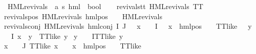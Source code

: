 \begin{isabellebody}
\ HML{\isacharunderscore}{\kern0pt}revivals\ {\isacharcolon}{\kern0pt}{\isacharcolon}{\kern0pt}\ {\isachardoublequoteopen}{\isacharparenleft}{\kern0pt}{\isacharprime}{\kern0pt}a{\isacharcomma}{\kern0pt}\ {\isacharprime}{\kern0pt}s{\isacharparenright}{\kern0pt}\ hml\ {\isasymRightarrow}\ bool{\isachardoublequoteclose}\ \isanewline
\ \ \isanewline
revivals{\isacharunderscore}{\kern0pt}tt{\isacharcolon}{\kern0pt}\ {\isachardoublequoteopen}HML{\isacharunderscore}{\kern0pt}revivals\ TT{\isachardoublequoteclose}\ {\isacharbar}{\kern0pt}\isanewline
revivals{\isacharunderscore}{\kern0pt}pos{\isacharcolon}{\kern0pt}\ {\isachardoublequoteopen}HML{\isacharunderscore}{\kern0pt}revivals\ {\isacharparenleft}{\kern0pt}hml{\isacharunderscore}{\kern0pt}pos\ {\isasymalpha}\ {\isasymphi}{\isacharparenright}{\kern0pt}{\isachardoublequoteclose}\ \ {\isachardoublequoteopen}HML{\isacharunderscore}{\kern0pt}revivals\ {\isasymphi}{\isachardoublequoteclose}\ {\isacharbar}{\kern0pt}\isanewline
revivals{\isacharunderscore}{\kern0pt}conj{\isacharcolon}{\kern0pt}\ {\isachardoublequoteopen}HML{\isacharunderscore}{\kern0pt}revivals\ {\isacharparenleft}{\kern0pt}hml{\isacharunderscore}{\kern0pt}conj\ I\ J\ {\isasymPhi}{\isacharparenright}{\kern0pt}{\isachardoublequoteclose}\ \ {\isachardoublequoteopen}{\isacharparenleft}{\kern0pt}{\isasymexists}x\ {\isasymin}\ {\isacharparenleft}{\kern0pt}{\isasymPhi}\ {\isacharbackquote}{\kern0pt}\ I{\isacharparenright}{\kern0pt}{\isachardot}{\kern0pt}\ {\isacharparenleft}{\kern0pt}{\isasymexists}{\isasymalpha}\ {\isasymchi}{\isachardot}{\kern0pt}\ {\isacharparenleft}{\kern0pt}x\ {\isacharequal}{\kern0pt}\ hml{\isacharunderscore}{\kern0pt}pos\ {\isasymalpha}\ {\isasymchi}{\isacharparenright}{\kern0pt}\ {\isasymand}\ TT{\isacharunderscore}{\kern0pt}like\ {\isasymchi}{\isacharparenright}{\kern0pt}\ {\isasymand}\ {\isacharparenleft}{\kern0pt}{\isasymforall}y\ {\isasymin}\ {\isacharparenleft}{\kern0pt}{\isasymPhi}\ {\isacharbackquote}{\kern0pt}\ I{\isacharparenright}{\kern0pt}{\isachardot}{\kern0pt}\ x\ {\isasymnoteq}\ y\ {\isasymlongrightarrow}\ TT{\isacharunderscore}{\kern0pt}like\ y{\isacharparenright}{\kern0pt}{\isacharparenright}{\kern0pt}\isanewline
{\isasymor}\ {\isacharparenleft}{\kern0pt}{\isasymforall}y\ {\isasymin}\ {\isacharparenleft}{\kern0pt}{\isasymPhi}\ {\isacharbackquote}{\kern0pt}\ I{\isacharparenright}{\kern0pt}{\isachardot}{\kern0pt}TT{\isacharunderscore}{\kern0pt}like\ y{\isacharparenright}{\kern0pt}{\isachardoublequoteclose}\isanewline
{\isachardoublequoteopen}{\isacharparenleft}{\kern0pt}{\isasymforall}x\ {\isasymin}\ {\isacharparenleft}{\kern0pt}{\isasymPhi}\ {\isacharbackquote}{\kern0pt}\ J{\isacharparenright}{\kern0pt}{\isachardot}{\kern0pt}\ TT{\isacharunderscore}{\kern0pt}like\ x\ {\isasymor}\ {\isacharparenleft}{\kern0pt}{\isasymexists}{\isasymalpha}\ {\isasymchi}{\isachardot}{\kern0pt}\ {\isacharparenleft}{\kern0pt}x\ {\isacharequal}{\kern0pt}\ hml{\isacharunderscore}{\kern0pt}pos\ {\isasymalpha}\ {\isasymchi}{\isacharparenright}{\kern0pt}\ {\isasymand}\ TT{\isacharunderscore}{\kern0pt}like\ {\isasymchi}{\isacharparenright}{\kern0pt}{\isacharparenright}{\kern0pt}{\isachardoublequoteclose}\isanewline

\end{isabellebody}

